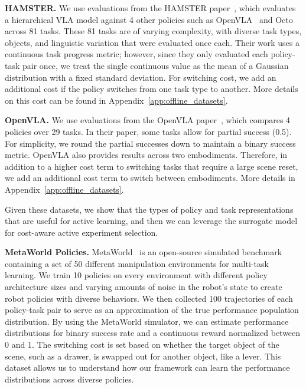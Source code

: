 


\textbf{HAMSTER.}
We use evaluations from the HAMSTER paper~\cite{li2025hamster}, which evaluates a hierarchical VLA model against 4 other policies such as OpenVLA~\cite{kim24openvla} and Octo~\cite{octo_2023} across 81 tasks. 
These 81 tasks are of varying complexity, with diverse task types, objects, and linguistic variation that were evaluated once each.
Their work uses a continuous task progress metric; however, since they only evaluated each policy-task pair once, we treat the single continuous value as the mean of a Gaussian distribution with a fixed standard deviation.
For switching cost, we add an additional cost if the policy switches from one task type to another. 
More details on this cost can be found in Appendix~\ref{app:offline_datasets}.

\textbf{OpenVLA.}
We use evaluations from the OpenVLA paper~\cite{kim24openvla}, which compares 4 policies over 29 tasks. 
In their paper, some tasks allow for partial success (0.5). 
For simplicity, we round the partial successes down to maintain a binary success metric.
OpenVLA also provides results across two embodiments.
Therefore, in addition to a higher cost term to switching tasks that require a large scene reset, we add an additional cost term to switch between embodiments. More details in Appendix~\ref{app:offline_datasets}.

Given these datasets, we show that the types of policy and task representations that are useful for active learning, and then we can leverage the surrogate model for cost-aware active experiment selection. 


\textbf{MetaWorld Policies.}
MetaWorld~\cite{yu2020meta} is an open-source simulated benchmark containing a set of 50 different manipulation environments for multi-task learning.
We train 10 policies on every environment with different policy architecture sizes and varying amounts of noise in the robot's state to create robot policies with diverse behaviors.
We then collected 100 trajectories of each policy-task pair to serve as an approximation of the true performance population distribution.
By using the MetaWorld simulator, we can estimate performance distributions for binary success rate and a continuous reward normalized between 0 and 1.
The switching cost is set based on whether the target object of the scene, such as a drawer, is swapped out for another object, like a lever.
This dataset allows us to understand how our framework can learn the performance distributions across diverse policies.

